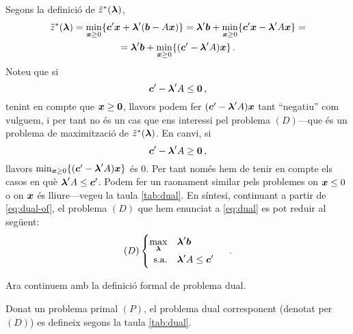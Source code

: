Segons la definició de $\tilde{z}^\ast(\boldsymbol{\lambda})$,
%
\begin{equation}\label{eq:dual-of}
\begin{gathered}
\tilde{z}^\ast(\boldsymbol{\lambda})
= \min_{\boldsymbol{x}\ge 0} \{\boldsymbol{c}'\boldsymbol{x}+\boldsymbol{\lambda}'(\boldsymbol{b}-A\boldsymbol{x})\}
= \boldsymbol{\lambda}'\boldsymbol{b}+
\min_{\boldsymbol{x}\ge0}\{\boldsymbol{c}'\boldsymbol{x}-\boldsymbol{\lambda}'A\boldsymbol{x}\}=\\
=  \boldsymbol{\lambda}'\boldsymbol{b}+ \min_{\boldsymbol{x}\ge0}\{(\boldsymbol{c}'-\boldsymbol{\lambda}'A)\boldsymbol{x}\}\,.
\end{gathered}
\end{equation}
%
Noteu que si \[\boldsymbol{c}'-\boldsymbol{\lambda}'A \le \boldsymbol{0}\,,\] tenint en compte que
$\boldsymbol{x}\ge\boldsymbol{0}$, llavors podem fer $(\boldsymbol{c}'-\boldsymbol{\lambda}'A)\boldsymbol{x}$ tant
``negatiu'' com vulguem, i per tant no és un cas que ens interessi pel problema
$(D)$---que és un problema de maximització de $\tilde{z}^\ast(\boldsymbol{\lambda})$. En
canvi, si \[\boldsymbol{c}'-\boldsymbol{\lambda}'A \ge \boldsymbol{0}\,,\] llavors
$\min_{\boldsymbol{x}\ge0}\{(\boldsymbol{c}'-\boldsymbol{\lambda}'A)\boldsymbol{x}\}$ és 0. Per tant només hem
de tenir en compte els casos en què $\boldsymbol{\lambda}'A \le \boldsymbol{c}'$.  Podem fer un
raonament similar pels problemes on $\boldsymbol{x}\le 0$ o on $\boldsymbol{x}$ és
lliure---vegeu la taula \ref{tab:dual}. En síntesi, continuant a partir de
\eqref{eq:dual-of}, el problema $(D)$ que hem enunciat a \eqref{eq:dual} es pot
reduir al següent:
\[
(D)
\begin{cases}
\begin{aligned}
\max_{\boldsymbol{\lambda}}		&&& \boldsymbol{\lambda}'\boldsymbol{b}\\
\text{s.a.}				&&& \boldsymbol{\lambda}'A \le \boldsymbol{c}'\\
\end{aligned}
\end{cases}\ .
\]

Ara continuem amb la definició formal de problema dual.

\begin{defi}
	Donat un problema primal $(P)$, el problema dual corresponent (denotat per
	$(D)$) es defineix segons la taula \ref{tab:dual}.
\end{defi}


